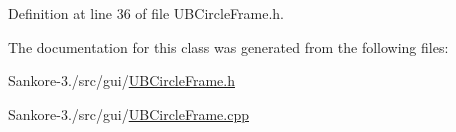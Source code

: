 Definition at line 36 of file U\-B\-Circle\-Frame.\-h.



The documentation for this class was generated from the following files\-:\begin{DoxyCompactItemize}
\item 
Sankore-\/3./src/gui/\hyperlink{_u_b_circle_frame_8h}{U\-B\-Circle\-Frame.\-h}\item 
Sankore-\/3./src/gui/\hyperlink{_u_b_circle_frame_8cpp}{U\-B\-Circle\-Frame.\-cpp}\end{DoxyCompactItemize}
